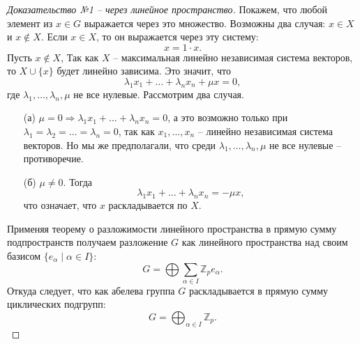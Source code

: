 \documentclass{article}
\begin{document}
\begin{proof}[Доказательство №1 -- через линейное пространство]
    Покажем, что любой элемент из $x \in G$ выражается через это множество. Возможны два случая: $x \in X$ и $x \notin X$. Если $x \in X$, то он выражается через эту систему: $$ x = 1 \cdot x. $$ Пусть $x \notin X$, Так как $X$ -- максимальная линейно независимая система векторов, то $X \cup \{ x \}$ будет линейно зависима. Это значит, что $$ \lambda_1 x_1 + \ldots + \lambda_n x_n + \mu x = 0, $$ где $\lambda_1, \dots, \lambda_n, \mu$ не все нулевые.
    Рассмотрим два случая.
    \begin{enumerate}
        \item[(а)] $\mu  = 0 \Rightarrow \lambda_1 x_1 + \ldots + \lambda_n x_n = 0 $, а это возможно только при $\lambda_1 = \lambda_2 = \dots = \lambda_n = 0$, так как $x_1, \dots, x_n$ -- линейно независимая система векторов. Но мы же предполагали, что среди $\lambda_1, \dots, \lambda_n, \mu$ не все нулевые -- противоречие.
        \item[(б)] $\mu \neq 0$. Тогда $$ \lambda_1 x_1 + \ldots + \lambda_n x_n = - \mu x, $$ что означает, что $x$ раскладывается по $X$.
    \end{enumerate}

    Применяя теорему о разложимости линейного пространства в прямую сумму подпространств получаем разложение $G$ как линейного пространства над своим базисом $\{ e_\alpha \mid \alpha \in I \}$: $$ G = \bigoplus \sum_{\alpha \in I} \mathbb{Z}_p e_{\alpha}. $$ Откуда следует, что как абелева группа $G$ раскладывается в прямую сумму циклических подгрупп: $$ G = \bigoplus_{\alpha \in I} \mathbb{Z}_p. $$
\end{proof}
\end{document}
